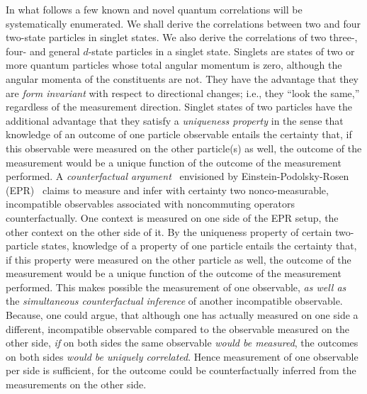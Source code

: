 \documentclass[pra,amsfonts,showpacs,showkeys,preprint]{revtex4}
\begin{document}
In what follows a few known and novel quantum correlations will be systematically enumerated.
We shall derive the correlations between two and four two-state particles in singlet states.
We also derive the correlations of two three-, four- and general $d$-state particles in a singlet state.
Singlets are states of two or more quantum particles whose total angular momentum is zero,
although the angular momenta of the constituents are not.
They have the advantage that
they are {\em form invariant} with respect to directional changes; i.e., they ``look the same,'' regardless of the measurement direction.
Singlet states of two particles have the additional advantage that they satisfy a {\em uniqueness property} \cite{svozil-2006-uniquenessprinciple}
in the sense that knowledge of an outcome of one particle observable entails the certainty that,
if this observable were measured on the other particle(s) as well,
the outcome of the measurement would be a unique function of the outcome of the measurement performed.
A {\em counterfactual argument}~\cite[p.~243]{specker-60} envisioned by
Einstein-Podolsky-Rosen (EPR)~\cite{epr}
claims to measure and infer with certainty two nonco-measurable, incompatible observables associated with noncommuting operators counterfactually.
One context is measured on one side of the EPR setup, the other context on the other side of it.
By the uniqueness property  of certain two-particle states,
knowledge of a property of one particle entails the certainty
that, if this property were measured on the other particle as well, the outcome of the measurement would be
a unique function of the outcome of the measurement performed.
This makes possible the measurement of one observable, {\em as well as} the {\em simultaneous counterfactual inference} of another incompatible observable.
Because, one could argue, that although one has actually measured on one side a different, incompatible observable compared to the observable measured on the other side,
{\em if} on both sides the same  observable {\em would be measured}, the outcomes on both sides {\em would be uniquely correlated}.
Hence measurement of one observable per side is sufficient, for the outcome could be counterfactually inferred from the measurements on the other side.







\end{document}
